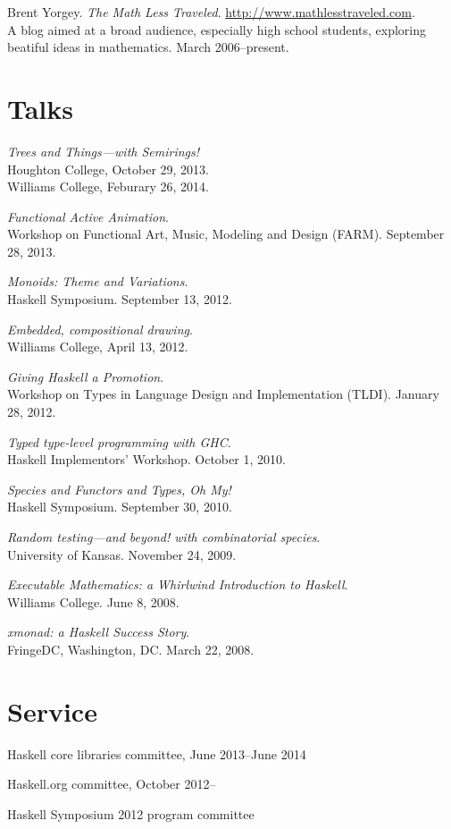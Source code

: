 \documentclass{article}
\newcommand{\cvitem}{\par\hangpara{2em}{1}}
\begin{document}
\cvitem Brent Yorgey. \emph{The Math Less
  Traveled}. \url{http://www.mathlesstraveled.com}. \\
A blog aimed at a broad audience, especially high school students,
exploring beatiful ideas in mathematics.  March 2006--present.

\section*{Talks}

\cvitem \emph{Trees and Things---with Semirings!} \\
    Houghton College, October 29, 2013. \\
    Williams College, Feburary 26, 2014.
\cvitem \emph{Functional Active Animation}. \\
    Workshop on Functional Art, Music, Modeling and Design (FARM).  September 28, 2013.
\cvitem \emph{Monoids: Theme and Variations}. \\
    Haskell Symposium. September 13, 2012.
\cvitem \emph{Embedded, compositional drawing}. \\
    Williams College, April 13, 2012.
\cvitem \emph{Giving Haskell a Promotion}. \\
    Workshop on Types in Language Design and Implementation (TLDI). January 28, 2012.
\cvitem \emph{Typed type-level programming with GHC}. \\
    Haskell Implementors' Workshop. October 1, 2010.
\cvitem \emph{Species and Functors and Types, Oh My!} \\
    Haskell Symposium. September 30, 2010.
\cvitem \emph{Random testing---and beyond! with combinatorial
    species}. \\
    University of Kansas.  November 24, 2009.
\cvitem \emph{Executable Mathematics: a Whirlwind Introduction to
    Haskell}. \\
    Williams College.  June 8, 2008.
\cvitem \emph{xmonad: a Haskell Success Story}. \\
    FringeDC, Washington, DC. March 22, 2008.

\section*{Service}
\cvitem Haskell core libraries committee, June 2013--June 2014

\cvitem Haskell.org committee, October 2012--

\cvitem Haskell Symposium 2012 program committee
\end{document}
